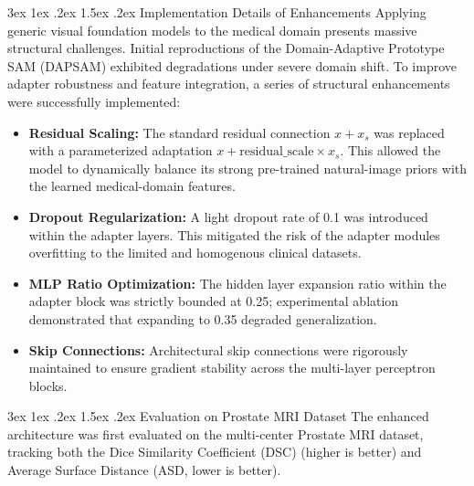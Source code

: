 \documentclass[journal,12pt,onecolumn,draftclsnofoot]{IEEEtran}
\makeatletter
\renewcommand{\subsection}{\@startsection{subsection}{2}{\z@}%
    {3ex \@plus 1ex \@minus .2ex}%
    {1.5ex \@plus.2ex}%
    {\normalfont\large\bfseries}}
\makeatother
\begin{document}
\subsection{Implementation Details of Enhancements}
Applying generic visual foundation models to the medical domain presents massive structural challenges. Initial reproductions of the Domain-Adaptive Prototype SAM (DAPSAM) exhibited degradations under severe domain shift. To improve adapter robustness and feature integration, a series of structural enhancements were successfully implemented:
\begin{itemize}
    \item \textbf{Residual Scaling:} The standard residual connection $x + x_s$ was replaced with a parameterized adaptation $x + \text{residual\_scale} \times x_s$. This allowed the model to dynamically balance its strong pre-trained natural-image priors with the learned medical-domain features.
    \item \textbf{Dropout Regularization:} A light dropout rate of 0.1 was introduced within the adapter layers. This mitigated the risk of the adapter modules overfitting to the limited and homogenous clinical datasets.
    \item \textbf{MLP Ratio Optimization:} The hidden layer expansion ratio within the adapter block was strictly bounded at 0.25; experimental ablation demonstrated that expanding to 0.35 degraded generalization.
    \item \textbf{Skip Connections:} Architectural skip connections were rigorously maintained to ensure gradient stability across the multi-layer perceptron blocks.
\end{itemize}

\subsection{Evaluation on Prostate MRI Dataset}
The enhanced architecture was first evaluated on the multi-center Prostate MRI dataset, tracking both the Dice Similarity Coefficient (DSC) (higher is better) and Average Surface Distance (ASD, lower is better). 
\end{document}

